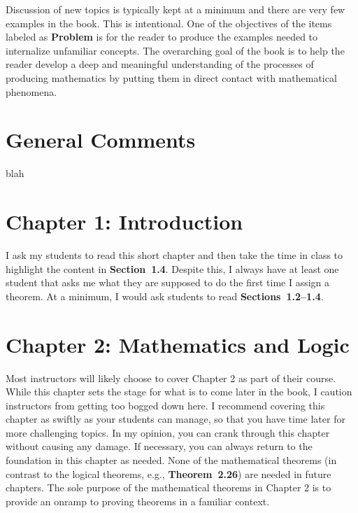 \documentclass[11pt]{article}%
\newcommand{\blankline}{\pagebreak[2]\vspace{.5\baselineskip}}
\begin{document}
\blankline

Discussion of new topics is typically kept at a minimum and there are very few examples in the book. This is intentional.  One of the objectives of the items labeled as \textbf{Problem} is for the reader to produce the examples needed to internalize unfamiliar concepts.  The overarching goal of the book is to help the reader develop a deep and meaningful understanding of the processes of producing mathematics by putting them in direct contact with mathematical phenomena.


\section*{General Comments}

blah


\section*{Chapter 1: Introduction}

I ask my students to read this short chapter and then take the time in class to highlight the content in \textbf{Section~1.4}.  Despite this, I always have at least one student that asks me what they are supposed to do the first time I assign a theorem.  At a minimum, I would ask students to read \textbf{Sections~1.2--1.4}.


\section*{Chapter 2: Mathematics and Logic}


Most instructors will likely choose to cover Chapter 2 as part of their course.  While this chapter sets the stage for what is to come later in the book, I caution instructors from getting too bogged down here.  I recommend covering this chapter as swiftly as your students can manage, so that you have time later for more challenging topics.  In my opinion, you can crank through this chapter without causing any damage. If necessary, you can always return to the foundation in this chapter as needed. None of the mathematical theorems (in contrast to the logical theorems, e.g., \textbf{Theorem~2.26}) are needed in future chapters.  The sole purpose of the mathematical theorems in Chapter 2 is to provide an onramp to proving theorems in a familiar context.
\end{document}

